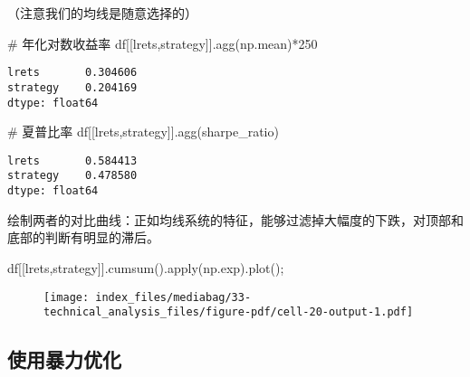 \documentclass[
  letterpaper,
  DIV=11,
  numbers=noendperiod]{scrreprt}
\newenvironment{Shaded}{\begin{snugshade}}{\end{snugshade}}
\newcommand{\BuiltInTok}[1]{\textcolor[rgb]{0.00,0.23,0.31}{#1}}
\newcommand{\CommentTok}[1]{\textcolor[rgb]{0.37,0.37,0.37}{#1}}
\newcommand{\DecValTok}[1]{\textcolor[rgb]{0.68,0.00,0.00}{#1}}
\newcommand{\NormalTok}[1]{\textcolor[rgb]{0.00,0.23,0.31}{#1}}
\newcommand{\OperatorTok}[1]{\textcolor[rgb]{0.37,0.37,0.37}{#1}}
\newcommand{\StringTok}[1]{\textcolor[rgb]{0.13,0.47,0.30}{#1}}
\begin{document}
（注意我们的均线是随意选择的）

\begin{Shaded}
\begin{Highlighting}[]
\CommentTok{\# 年化对数收益率}
\NormalTok{df[[}\StringTok{\textquotesingle{}lrets\textquotesingle{}}\NormalTok{,}\StringTok{\textquotesingle{}strategy\textquotesingle{}}\NormalTok{]].agg(np.mean)}\OperatorTok{*}\DecValTok{250}
\end{Highlighting}
\end{Shaded}

\begin{verbatim}
lrets       0.304606
strategy    0.204169
dtype: float64
\end{verbatim}

\begin{Shaded}
\begin{Highlighting}[]
\CommentTok{\# 夏普比率}
\NormalTok{df[[}\StringTok{\textquotesingle{}lrets\textquotesingle{}}\NormalTok{,}\StringTok{\textquotesingle{}strategy\textquotesingle{}}\NormalTok{]].agg(sharpe\_ratio)}
\end{Highlighting}
\end{Shaded}

\begin{verbatim}
lrets       0.584413
strategy    0.478580
dtype: float64
\end{verbatim}

绘制两者的对比曲线：正如均线系统的特征，能够过滤掉大幅度的下跌，对顶部和底部的判断有明显的滞后。

\begin{Shaded}
\begin{Highlighting}[]
\NormalTok{df[[}\StringTok{\textquotesingle{}lrets\textquotesingle{}}\NormalTok{,}\StringTok{\textquotesingle{}strategy\textquotesingle{}}\NormalTok{]].cumsum().}\BuiltInTok{apply}\NormalTok{(np.exp).plot()}\OperatorTok{;}
\end{Highlighting}
\end{Shaded}

\begin{figure}[H]

{\centering \texttt{[image: index\_files/mediabag/33-technical\_analysis\_files/figure-pdf/cell-20-output-1.pdf]}

}

\end{figure}

\hypertarget{ux4f7fux7528ux66b4ux529bux4f18ux5316}{%
\subsection{使用暴力优化}\label{ux4f7fux7528ux66b4ux529bux4f18ux5316}}
\end{document}
